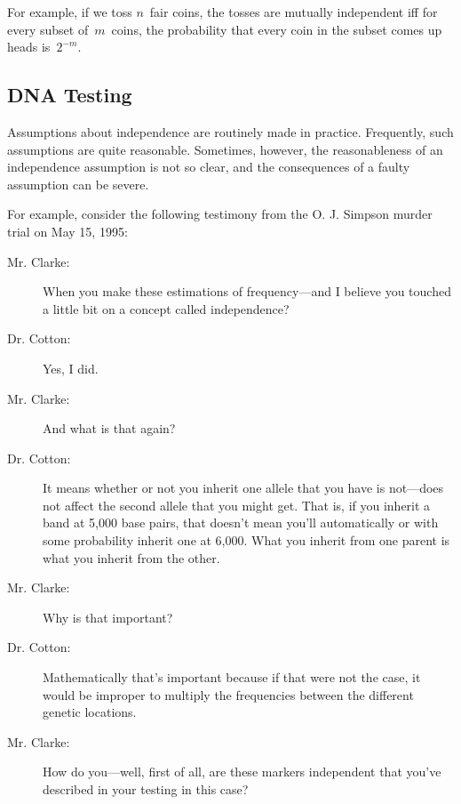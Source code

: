 For example, if we toss $n$~fair coins, the tosses are mutually
independent iff for every subset of~$m$~coins, the probability that
every coin in the subset comes up heads is~$2^{-m}$.

\subsection{DNA Testing}

Assumptions about independence are routinely made in practice.
Frequently, such assumptions are quite reasonable.  Sometimes,
however, the reasonableness of an independence assumption is not so
clear, and the consequences of a faulty assumption can be severe.

For example, consider the following testimony from the O. J. Simpson
murder trial on May 15, 1995:
\begin{description}

\item[Mr. Clarke:] When you make these estimations of frequency---and
I believe you touched a little bit on a concept called independence?

\item[Dr. Cotton:] Yes, I did.

\item[Mr. Clarke:] And what is that again?

\item[Dr. Cotton:] It means whether or not you inherit one allele that
you have is not---does not affect the second allele that you might
get.  That is, if you inherit a band at 5,000 base pairs, that doesn't
mean you'll automatically or with some probability inherit one at
6,000.  What you inherit from one parent is what you inherit from the
other.

\item[Mr. Clarke:] Why is that important?

\item[Dr. Cotton:] Mathematically that's important because if that
were not the case, it would be improper to multiply the frequencies
between the different genetic locations.

\item[Mr. Clarke:] How do you---well, first of all, are these markers
independent that you've described in your testing in this case?

\end{description}

